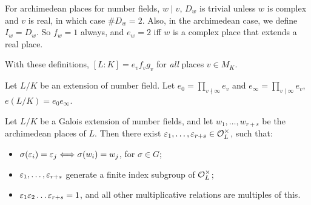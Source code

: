 \documentclass[11pt]{amsart}
\begin{document}
\begin{Rem}
    For archimedean places for number fields, $w\mid v$, $D_w$ is trivial unless $w$ is complex and $v$ is real, in which case $\# D_w = 2$. Also, in the archimedean case, we define $I_w = D_w$. So $f_w=1$ always, and $e_w=2$ iff $w$ is a complex place that extends a real place.
\end{Rem}

With these definitions, $[L:K] = e_vf_vg_v$ for \emph{all} places $v\in M_K$.


\begin{defn}
    Let $L/K$ be an extension of number field. Let $e_0 = \prod_{v\nmid \infty} e_v$ and $e_\infty = \prod_{v\mid \infty} e_v$, $e(L/K) = e_0e_\infty$.
\end{defn}

\begin{thm}
    Let $L/K$ be a Galois extension of number fields, and let $w_1,\dots,w_{r+s}$ be the archimedean places of $L$. Then there exist $\varepsilon_1,\dots,\varepsilon_{r+s}\in \mathcal{O}_L^\times$, such that:
    \begin{itemize}
        \item $\sigma(\varepsilon_i) = \varepsilon_j \Longleftrightarrow \sigma(w_i) = w_j$, for $\sigma\in G$;
        \item $\varepsilon_1,\dots,\varepsilon_{r+s}$ generate a finite index subgroup of $\mathcal{O}_L^\times$;
        \item $\varepsilon_1\varepsilon_2\dots\varepsilon_{r+s} = 1$, and all other multiplicative relations are multiples of this.
    \end{itemize}
\end{thm}
\end{document}
